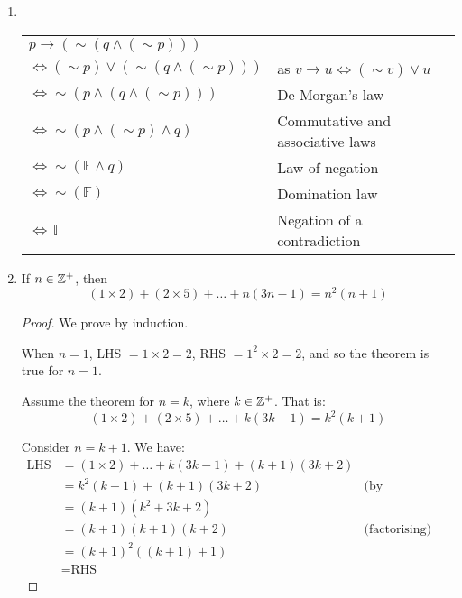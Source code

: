 
\begin{enumerate}
\item ~

    \begin{tabular}{ll}
        $p \rightarrow (\sim (q \wedge (\sim p)))$ & \\
        $\Leftrightarrow(\sim p) \vee (\sim (q \wedge (\sim p)))$ &
            as $v \rightarrow u \Leftrightarrow (\sim v) \vee u$ \\
        $\Leftrightarrow\sim(p \wedge (q \wedge (\sim p)))$ &
            De Morgan's law \\
        $\Leftrightarrow\sim(p \wedge (\sim p) \wedge q)$ &
            Commutative and associative laws \\
        $\Leftrightarrow\sim(\mathbb{F} \wedge q)$ & Law of negation \\
        $\Leftrightarrow\sim(\mathbb{F})$ & Domination law \\
        $\Leftrightarrow\mathbb{T}$ & Negation of a contradiction \\
    \end{tabular}

\item
    \begin{theorem}
        If $n \in \mathbb{Z}^+$, then
        $$(1 \times 2) + (2 \times 5) + \dots + n(3n-1) = n^2(n+1)$$
    \end{theorem}
    \begin{proof}
        We prove by induction.

        When $n = 1$, LHS $= 1 \times 2 = 2$, RHS $= 1^2 \times 2 = 2$,
        and so the theorem is true for $n=1$.

        Assume the theorem for $n=k$, where $k \in \mathbb{Z}^+$. That is:
        $$(1 \times 2) + (2 \times 5) + \dots + k(3k-1) = k^2(k+1)$$

        Consider $n = k+1$. We have:
        \begin{align*}
            \textrm{LHS} &= (1 \times 2) + \dots + k(3k-1) + (k+1)(3k+2) \\
            &= k^2(k+1) + (k+1)(3k+2) & \textrm{(by assumption)} \\
            &= (k+1)(k^2 + 3k + 2) \\
            &= (k+1)(k+1)(k+2) & \textrm{(factorising)} \\
            &= (k+1)^2((k+1)+1) \\
            &= \textrm{RHS}
        \end{align*}


\end{proof}
\end{enumerate}
